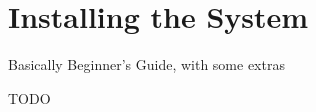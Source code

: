 \chapter{Installing the System}

\begin{chapsummary}
Basically Beginner's Guide, with some extras
\end{chapsummary}

TODO

